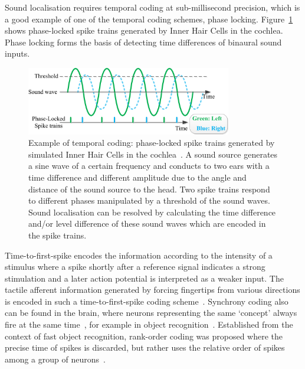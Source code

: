 Sound localisation requires temporal coding at sub-millisecond precision, which is a good example of one of the temporal coding schemes, phase locking.
Figure~\ref{Fig:audio_fibre} shows phase-locked spike trains generated by Inner Hair Cells in the cochlea.
Phase locking forms the basis
of detecting time differences of binaural sound inputs.
\begin{figure}[bt]
	\centering
	\includegraphics[width=0.8\textwidth]{pics_snn/phaselocking.png}
	\caption[Example of temporal coding~\citep{liu2013modeling}.]{Example of temporal coding: phase-locked spike trains generated by simulated Inner Hair Cells in the cochlea~\citep{liu2013modeling}.
	A sound source generates a sine wave of a certain frequency and conducts to two ears with a time difference and different amplitude due to the angle and distance of the sound source to the head.
	Two spike trains respond to different phases manipulated by a threshold of the sound waves.
	Sound localisation can be resolved by calculating the time difference and/or level difference of these sound waves which are encoded in the spike trains.
    }
	\label{Fig:audio_fibre}
\end{figure}

Time-to-first-spike encodes the information according to the intensity of a stimulus where a spike shortly after a reference signal indicates a strong stimulation and a later action potential is interpreted as a weaker input.
The tactile afferent information generated by forcing fingertips from various directions is encoded in such a time-to-first-spike coding scheme~\citep{johansson2004first}.
Synchrony coding also can be found in the brain, where neurons representing the same `concept' always fire at the same time~\citep{von1994correlation}, for example in object recognition~\citep{gray1989stimulus}.
Established from the context of fast object recognition, rank-order coding was proposed where the precise time of spikes is discarded, but rather uses the relative order of spikes among a group of neurons~\citep{gautrais1998rate}.


